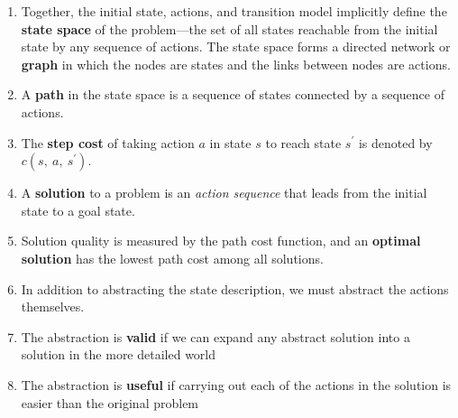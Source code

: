 \begin{enumerate}
    \item Together, the initial state, actions, and transition model implicitly define the \textbf{state space} of the problem—the set of all states reachable from the initial state by any sequence of actions. The state space forms a directed network or \textbf{graph} in which the nodes are states and the links between nodes are actions.
    \hfill \cite{ai/book/Artificial-Intelligence-A-Modern-Approach/Russell-Norvig}

    \item A \textbf{path} in the state space is a sequence of states connected by a sequence of actions.
    \hfill \cite{ai/book/Artificial-Intelligence-A-Modern-Approach/Russell-Norvig}

    \item The \textbf{step cost} of taking action $a$ in state $s$ to reach state $s^\prime$ is denoted by $c(s,\ a,\ s^\prime)$.
    \hfill \cite{ai/book/Artificial-Intelligence-A-Modern-Approach/Russell-Norvig}

    \item A \textbf{solution} to a problem is an \textit{action sequence} that leads from the initial state to a goal state. 
    \hfill \cite{ai/book/Artificial-Intelligence-A-Modern-Approach/Russell-Norvig}
    
    \item Solution quality is measured by the path cost function, and an \textbf{optimal solution} has the lowest path cost among all solutions.
    \hfill \cite{ai/book/Artificial-Intelligence-A-Modern-Approach/Russell-Norvig}

    \item In addition to abstracting the state description, we must abstract the actions themselves.
    \hfill \cite{ai/book/Artificial-Intelligence-A-Modern-Approach/Russell-Norvig}

    \item The abstraction is \textbf{valid} if we can expand any abstract solution into a solution in the more detailed world
    \hfill \cite{ai/book/Artificial-Intelligence-A-Modern-Approach/Russell-Norvig}

    \item The abstraction is \textbf{useful} if carrying out each of the actions in the solution is easier than the original problem
    \hfill \cite{ai/book/Artificial-Intelligence-A-Modern-Approach/Russell-Norvig}
\end{enumerate}






